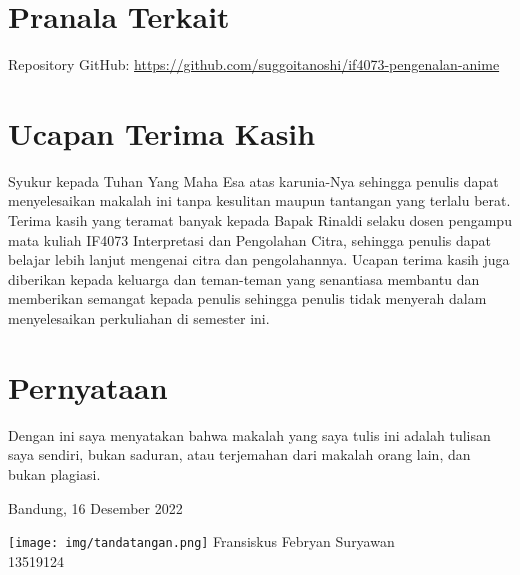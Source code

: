 \documentclass[conference, a4paper]{IEEEtran}
\begin{document}
\section*{Pranala Terkait}
 {
  \setlength{\parindent}{0pt}
  Repository GitHub: \url{https://github.com/suggoitanoshi/if4073-pengenalan-anime}
 }

\section*{Ucapan Terima Kasih}
Syukur kepada Tuhan Yang Maha Esa atas karunia-Nya sehingga penulis dapat menyelesaikan makalah ini tanpa kesulitan maupun tantangan yang terlalu berat. Terima kasih yang teramat banyak kepada Bapak Rinaldi selaku dosen pengampu mata kuliah IF4073 Interpretasi dan Pengolahan Citra, sehingga penulis dapat belajar lebih lanjut mengenai citra dan pengolahannya. Ucapan terima kasih juga diberikan kepada keluarga dan teman-teman yang senantiasa membantu dan memberikan semangat kepada penulis sehingga penulis tidak menyerah dalam menyelesaikan perkuliahan di semester ini.



\vspace{12pt}

\section*{Pernyataan}
\noindent
Dengan ini saya menyatakan bahwa makalah yang saya tulis ini adalah tulisan saya sendiri, bukan saduran, atau terjemahan dari makalah orang lain, dan bukan plagiasi.

  {
    \raggedleft

    Bandung, 16 Desember 2022

    \texttt{[image: img/tandatangan.png]}
    Fransiskus Febryan Suryawan\\
    13519124\\
  }
\end{document}
